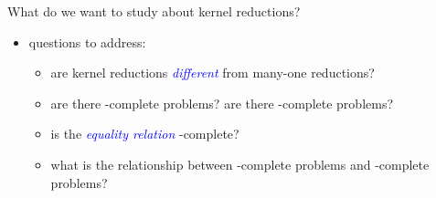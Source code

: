 \documentclass[final]{beamer}
\newcommand{\emphblue}[1]{\emph{\textcolor{blue}{#1}}}
\begin{document}
\begin{frame}{}
\begin{columns}[t]
\begin{column}{.3\linewidth}
      \begin{block}{\LARGE What do we want to study about kernel reductions?}
        \begin{itemize}\Large
        \item questions to address:
          \begin{itemize}\Large
          \item are kernel reductions \emphblue{different} from many-one
            reductions?
          \item are there \PEq-complete problems? are there \NPEq-complete
            problems?
          \item is the \emphblue{equality relation} \PEq-complete?
          \item what is the relationship between \NP-complete problems and
            \NPEq-complete problems?
          \end{itemize}
        \end{itemize}
      \end{block}

    \end{column}

  \end{columns}
\end{frame}
\end{document}
